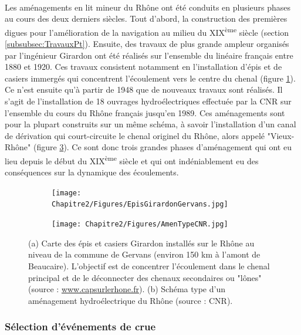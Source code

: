 	\paragraph{} Les aménagements en lit mineur du Rhône ont été conduits en plusieurs phases au cours des deux derniers siècles. Tout d'abord, la construction des premières digues pour l'amélioration de la navigation au milieu du XIX\textsuperscript{ème} siècle (section \ref{subsubsec:TravauxPt}). Ensuite, des travaux de plus grande ampleur organisés par l'ingénieur Girardon ont été réalisés sur l'ensemble du linéaire français entre 1880 et 1920. Ces travaux consistent notamment en l'installation d'épis et de casiers immergés qui concentrent l'écoulement vers le centre du chenal (figure \ref{subfig:Girardon}). Ce n'est ensuite qu'à partir de 1948 que de nouveaux travaux sont réalisés. Il s'agit de l'installation de 18 ouvrages hydroélectriques effectuée par la CNR sur l'ensemble du cours du Rhône français jusqu'en 1989. Ces aménagements sont pour la plupart construits sur un même schéma, à savoir l'installation d'un canal de dérivation qui court-circuite le chenal originel du Rhône, alors appelé "Vieux-Rhône" (figure \ref{subfig:SchemaCNR}). Ce sont donc trois grandes phases d'aménagement qui ont eu lieu depuis le début du XIX\textsuperscript{ème} siècle et qui ont indéniablement eu des conséquences sur la dynamique des écoulements. 
	
	\begin{figure}[h!]
		\centering
		\begin{subfigure}{0.7\linewidth}
		\texttt{[image: Chapitre2/Figures/EpisGirardonGervans.jpg]}
		\caption{}
		\label{subfig:Girardon}
		\end{subfigure}	
		\begin{subfigure}{0.5\linewidth}
		\centering
		\texttt{[image: Chapitre2/Figures/AmenTypeCNR.jpg]}
		\caption{}
		\label{subfig:SchemaCNR}
		\end{subfigure}
		\caption{(a) Carte des épis et casiers Girardon installés sur le Rhône au niveau de la commune de Gervans (environ 150 km à l'amont de Beaucaire). L'objectif est de concentrer l'écoulement dans le chenal principal et de le déconnecter des chenaux secondaires ou "lônes" (source : \url{www.capsurlerhone.fr}). (b) Schéma type d'un aménagement hydroélectrique du Rhône (source : CNR).}
	\end{figure}		

	\FloatBarrier
		
	\subsubsection{Sélection d'événements de crue}
	
